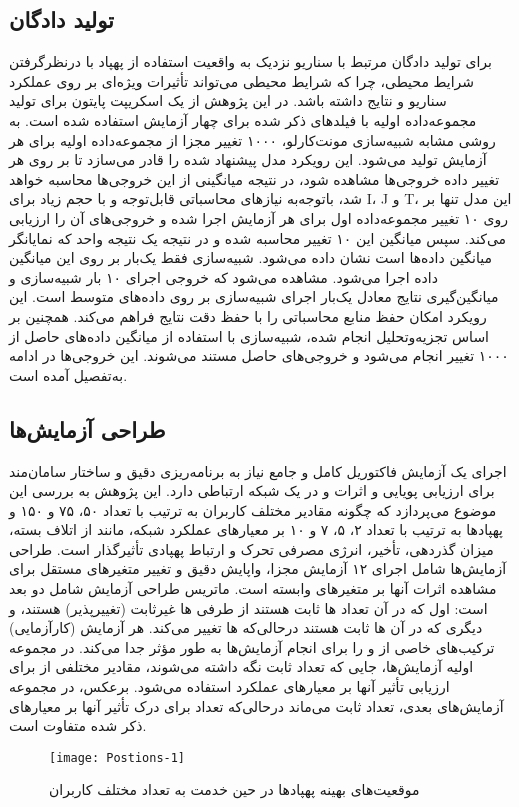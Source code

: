 \subsection{تولید دادگان}
برای تولید دادگان مرتبط با سناریو نزدیک به واقعیت استفاده از پهپاد با درنظرگرفتن شرایط محیطی، چرا که شرایط محیطی می‌تواند تأثیرات ویژه‌ای بر روی عملکرد سناریو و نتایج داشته باشد. در این پژوهش از یک اسکریپت پایتون برای تولید مجموعه‌داده اولیه با فیلدهای ذکر شده برای چهار آزمایش استفاده شده است. به روشی مشابه شبیه‌سازی مونت‌کارلو، ۱۰۰۰ تغییر مجزا از مجموعه‌داده اولیه برای هر آزمایش تولید می‌شود. این رویکرد مدل پیشنهاد شده را قادر می‌سازد تا بر روی هر تغییر داده خروجی‌ها مشاهده شود، در نتیجه میانگینی از این خروجی‌ها محاسبه خواهد شد، باتوجه‌به نیازهای محاسباتی قابل‌توجه و با حجم زیاد برای I، J و T، این مدل تنها بر روی ۱۰ تغییر مجموعه‌داده اول برای هر آزمایش اجرا شده و خروجی‌های آن را ارزیابی می‌کند. سپس میانگین این ۱۰ تغییر محاسبه شده و در نتیجه یک نتیجه واحد که نمایانگر میانگین داده‌ها است نشان داده می‌شود. شبیه‌سازی فقط یک‌بار بر روی این میانگین داده اجرا می‌شود. مشاهده می‌شود که خروجی اجرای ۱۰ بار شبیه‌سازی و میانگین‌گیری نتایج معادل یک‌بار اجرای شبیه‌سازی بر روی داده‌های متوسط است. این رویکرد امکان حفظ منابع محاسباتی را با حفظ دقت نتایج فراهم می‌کند. همچنین بر اساس تجزیه‌وتحلیل انجام شده، شبیه‌سازی با استفاده از میانگین داده‌های حاصل از ۱۰۰۰ تغییر انجام می‌شود و خروجی‌های حاصل مستند می‌شوند. این خروجی‌ها در ادامه به‌تفصیل آمده است.
\subsection{طراحی آزمایش‌ها}
اجرای یک آزمایش فاکتوریل کامل و جامع نیاز به برنامه‌ریزی دقیق و ساختار سامان‌مند برای ارزیابی پویایی و اثرات   و  در یک شبکه ارتباطی دارد. این پژوهش به بررسی این موضوع می‌پردازد که چگونه مقادیر مختلف کاربران به ترتیب با تعداد ۵۰، ۷۵ و ۱۵۰ و پهپادها به ترتیب با تعداد ۲، ۵، ۷ و ۱۰ بر معیارهای عملکرد شبکه، مانند از اتلاف بسته، میزان گذردهی، تأخیر، انرژی مصرفی تحرک و ارتباط پهپادی تأثیرگذار است. طراحی آزمایش‌ها شامل اجرای ۱۲ آزمایش مجزا، واپایش دقیق و تغییر متغیرهای مستقل برای مشاهده اثرات آنها بر متغیرهای وابسته است. ماتریس طراحی آزمایش شامل دو بعد است: اول که در آن تعداد ها ثابت هستند از طرفی ها غیرثابت (تغییرپذیر) هستند، و دیگری که در آن ها ثابت هستند درحالی‌که ها تغییر می‌کند. هر آزمایش (کارآزمایی) ترکیب‌های خاصی از  و  را برای انجام آزمایش‌ها به طور مؤثر جدا می‌کند. در مجموعه اولیه آزمایش‌ها، جایی که تعداد  ثابت نگه داشته می‌شوند، مقادیر مختلفی از  برای ارزیابی تأثیر آنها بر معیارهای عملکرد استفاده می‌شود. برعکس، در مجموعه آزمایش‌های بعدی، تعداد  ثابت می‌ماند درحالی‌که تعداد  برای درک تأثیر آنها بر معیارهای ذکر شده متفاوت است.
\begin{figure}
\texttt{[image: Postions-1]}
\caption[%
موقعیت‌های بهینه پهپادها در حین خدمت به تعداد مختلف کاربران]{موقعیت‌های بهینه پهپادها در حین خدمت به تعداد مختلف کاربران}
\label{fig:PostionsPlots}
\end{figure}
